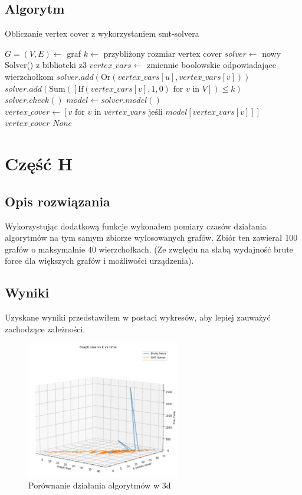\documentclass{article}
\begin{document}
\subsection{Algorytm}
\begin{algorithm}
\caption{Obliczanie vertex cover z wykorzystaniem smt-solvera}
\begin{algorithmic}[1]
\scriptsize
\STATE $G =  (V, E) \leftarrow$ graf
\STATE $k \leftarrow$ przybliżony rozmiar vertex cover
\STATE $solver \leftarrow$ nowy Solver() z biblioteki z3
\STATE $vertex\_vars \leftarrow$ zmiennie boolowskie odpowiadające wierzchołkom
    \STATE $solver.add(\text{Or}(vertex\_vars[u], vertex\_vars[v]))$
\ENDFOR
\STATE $solver.add(\text{Sum}([\text{If}(vertex\_vars[v], 1, 0) \text{ for } v \text{ in } V]) \leq k)$
\STATE $solver.check()$
    \STATE $model \leftarrow solver.model()$
    \STATE $vertex\_cover \leftarrow [v \text{ for } v \text{ in } vertex\_vars \text{ jeśli } model[vertex\_vars[v]]]$
    \RETURN $vertex\_cover$
\ELSE
    \RETURN $None$
\ENDIF
\end{algorithmic}
\end{algorithm}


\vspace{2cm}
\section{Część H}
\subsection{Opis rozwiązania}
Wykorzystując dodatkową funkcje wykonałem pomiary czasów działania algorytmów na tym samym zbiorze wylosowanych grafów.
Zbiór ten zawierał 100 grafów o maksymalnie 40 wierzchołkach. (Ze zwględu na słabą wydajność brute force dla większych grafów i możliwości urządzenia).
\subsection{Wyniki}
Uzyskane wyniki przedstawiłem w postaci wykresów, aby lepiej zauważyć zachodzące zależności.
\begin{figure}[h!]
    \centering
    \includegraphics[width=0.6\textwidth]{time_eval.png}
    \caption{Porównanie działania algorytmów w 3d}
    \label{fig:resultsH}
\end{figure}
\end{document}
